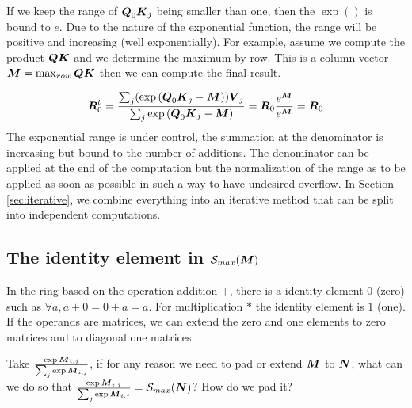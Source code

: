 \documentclass[conference]{IEEEtran}
\begin{document}
If we keep the range of ${\boldsymbol Q}_0{\boldsymbol K}_j$ being smaller than one,
then the $\exp()$ is bound to $e$. Due to the nature of the
exponential function, the range will be positive and increasing (well
exponentially). For example, assume we compute the product
${\boldsymbol Q}{\boldsymbol K}$ and we determine the maximum by row. This is a column
vector ${\boldsymbol M} = \max_{row} {\boldsymbol Q}{\boldsymbol K}$ then we can compute the
final result. 

\begin{equation}
  \label{eq:c}
  \Vc{R}_0^t = \frac{\sum_j(\exp{(\Vc{Q}_0\Vc{K}_j-\Vc{M})})\Vc{V}_j}{\sum_j\exp{(\Vc{Q}_0\Vc{K}_j-\Vc{M})}} =
     \Vc{R}_0\frac{e^{\Vc{M}}}{e^{\Vc{M}}}= \Vc{R}_0
\end{equation}
The exponential range is under control, the summation at the
denominator is increasing but bound to the number of additions.  The
denominator can be applied at the end of the computation but the
normalization of the range as to be applied as soon as possible in
such a way to have undesired overflow. In Section \ref{sec:iterative}, we combine
everything into an iterative method that can be split into independent
computations.

\subsection{The identity element in $\Smax{\Vc{M}}$}
\label{sec:identity}

In the ring based on the operation addition $+$, there is a identity
element $0$ (zero) such as $\forall a, a+0 = 0+a = a$. For
multiplication $*$ the identity element is $1$ (one). If the operands
are matrices, we can extend the zero and one elements to zero matrices
and to diagonal one matrices.

Take $\frac{\exp{{\boldsymbol M}_{i,j}}}{\sum_j\exp{{\boldsymbol M}_{i,j}}}$, if for any reason we need to pad or extend
${\boldsymbol M}$ to ${\boldsymbol N}$, what can we do so that $\Smaxd{\Vc{M}}=
\Smax{\Vc{N}}$? How do we pad it?
\end{document}
